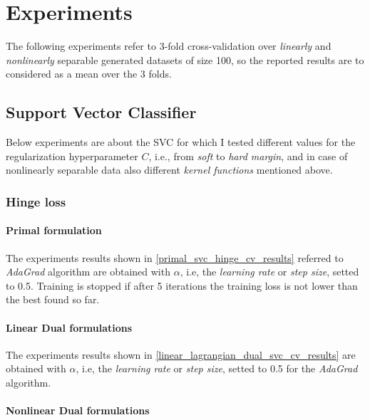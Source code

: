 \section{Experiments}

The following experiments refer to 3-fold cross-validation over \emph{linearly} and \emph{nonlinearly} separable generated datasets of size 100, so the reported results are to considered as a mean over the 3 folds.

\subsection{Support Vector Classifier}

Below experiments are about the SVC for which I tested different values for the regularization hyperparameter $C$, i.e., from \emph{soft} to \emph{hard margin}, and in case of nonlinearly separable data also different \emph{kernel functions} mentioned above.

\subsubsection{Hinge loss}

\paragraph{Primal formulation}

The experiments results shown in \ref{primal_svc_hinge_cv_results} referred to \emph{AdaGrad} algorithm are obtained with $\alpha$, i.e, the \emph{learning rate} or \emph{step size}, setted to 0.5. Training is stopped if after 5 iterations the training loss is not lower than the best found so far.



\paragraph{Linear Dual formulations}

The experiments results shown in \ref{linear_lagrangian_dual_svc_cv_results} are obtained with $\alpha$, i.e, the \emph{learning rate} or \emph{step size}, setted to 0.5 for the \emph{AdaGrad} algorithm.





\paragraph{Nonlinear Dual formulations}

